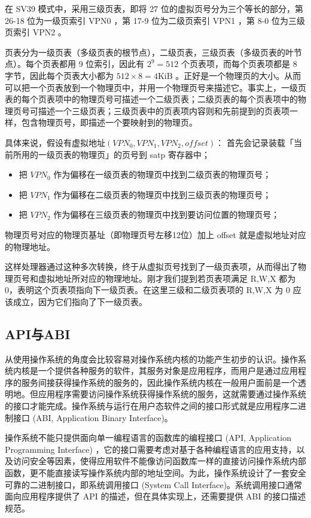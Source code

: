 在 SV39 模式中，采用三级页表，即将 27 位的虚拟页号分为三个等长的部分，第 26-18 位为一级页索引 VPN0 ，第 17-9 位为二级页索引 VPN1 ，第 8-0 位为三级页索引 VPN2 。

页表分为一级页表（多级页表的根节点），二级页表，三级页表（多级页表的叶节点）。每个页表都用 9 位索引，因此有 $2^9=512$ 个页表项，而每个页表项都是 8 字节，因此每个页表大小都为 $512\times 8=4 \mathrm{KiB}$ 。正好是一个物理页的大小。从而可以把一个页表放到一个物理页中，并用一个物理页号来描述它。事实上，一级页表的每个页表项中的物理页号可描述一个二级页表；二级页表的每个页表项中的物理页号可描述一个三级页表；三级页表中的页表项内容则和先前提到的页表项一样，包含物理页号，即描述一个要映射到的物理页。

具体来说，假设有虚拟地址$(VPN_{0} ,VPN_{1},VPN_{2},offset)$：
	首先会记录装载「当前所用的一级页表的物理页」的页号到 satp 寄存器中；
    \begin{itemize}
	\item 把 $VPN_{0}$ 作为偏移在一级页表的物理页中找到二级页表的物理页号；
	\item 把 $VPN_{1}$ 作为偏移在二级页表的物理页中找到三级页表的物理页号；
	\item 把 $VPN_{2}$ 作为偏移在三级页表的物理页中找到要访问位置的物理页号；
    \end{itemize}

	物理页号对应的物理页基址（即物理页号左移12位）加上 offset 就是虚拟地址对应的物理地址。

这样处理器通过这种多次转换，终于从虚拟页号找到了一级页表项，从而得出了物理页号和虚拟地址所对应的物理地址。刚才我们提到若页表项满足 R,W,X 都为 0，表明这个页表项指向下一级页表。在这里三级和二级页表项的 R,W,X 为 0 应该成立，因为它们指向了下一级页表。


\subsection{API与ABI}

从使用操作系统的角度会比较容易对操作系统内核的功能产生初步的认识。操作系统内核是一个提供各种服务的软件，其服务对象是应用程序，而用户是通过应用程序的服务间接获得操作系统的服务的，因此操作系统内核在一般用户面前是一个透明地。但应用程序需要访问操作系统获得操作系统的服务，这就需要通过操作系统的接口才能完成。操作系统与运行在用户态软件之间的接口形式就是应用程序二进制接口 (ABI, Application Binary Interface)。

操作系统不能只提供面向单一编程语言的函数库的编程接口 (API, Application Programming Interface) ，它的接口需要考虑对基于各种编程语言的应用支持，以及访问安全等因素，使得应用软件不能像访问函数库一样的直接访问操作系统内部函数，更不能直接读写操作系统内部的地址空间。为此，操作系统设计了一套安全可靠的二进制接口，即系统调用接口 (System Call Interface)。系统调用接口通常面向应用程序提供了 API 的描述，但在具体实现上，还需要提供 ABI 的接口描述规范。

